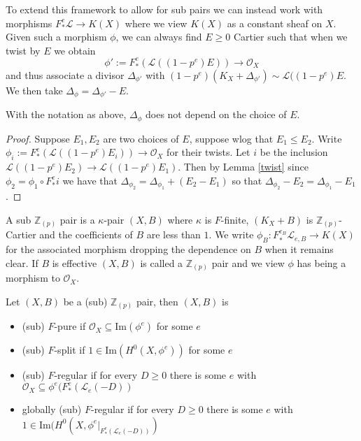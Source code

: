 \documentclass[a4paper,12pt]{book}
\newcommand{\Fe}[1][e]{F^{#1}_{*}}
\newcommand{\ox}[1][X]{\mathcal{O}_{#1}}
\newcommand{\zp}{\mathbb{Z}_{(p)}}
\begin{document}
To extend this framework to allow for sub pairs we can instead work with morphisms $\Fe\mathcal{L} \to K(X)$ where we view $K(X)$ as a constant sheaf on $X$. Given such a morphism $\phi$, we can always find $E \geq 0$ Cartier such that when we twist by $E$ we obtain $$\phi':=\Fe(\mathcal{L}((1-p^{e})E)) \to \ox$$ and thus associate a divisor $\Delta_{\phi'}$ with $(1-p^{e})(K_{X}+\Delta_{\phi'})\sim \mathcal{L}((1-p^{e})E$. We then take $\Delta_{\phi}=\Delta_{\phi'}-E$.

\begin{lemma}
	With the notation as above, $\Delta_{\phi}$ does not depend on the choice of $E$.
\end{lemma}
\begin{proof}
	Suppose $E_{1},E_{2}$ are two choices of $E$, suppose wlog that $E_{1} \leq E_{2}$. Write $\phi_{i}:=\Fe(\mathcal{L}((1-p^{e})E_{i})) \to \ox$ for their twists. Let $i$ be the inclusion $\mathcal{L}((1-p^{e})E_{2}) \to\mathcal{L}((1-p^{e})E_{1})$. Then by Lemma \ref{twist} since $\phi_{2}=\phi_{1}\circ F_{*}^{e}i$ we have that $\Delta_{\phi_{2}}=\Delta_{\phi_{1}}+(E_{2}-E_{1})$ so that $\Delta_{\phi_{2}}-E_{2}=\Delta_{\phi_{1}}-E_{1}$.
\end{proof}


\begin{definition}
	A sub $\zp$ pair is a $\kappa$-pair $(X,B)$ where $\kappa$ is $F$-finite, $(K_{X}+B)$ is $\zp$-Cartier and the coefficients of $B$ are less than $1$. We write $\phi_{B}: F_{*}^{e_{B}}\mathcal{L}_{e,B} \to K(X)$ for the associated morphism dropping the dependence on $B$ when it remains clear. If $B$ is effective $(X,B)$ is called a $\zp$ pair and we view $\phi$ has being a morphism to $\ox$.
	
	Let $(X,B)$ be a (sub) $\zp$ pair, then $(X,B)$ is
	\begin{itemize}
		\item (sub) $F$-pure if $\ox \subseteq \text{Im}(\phi^{e})$ for some $e$
		\item (sub) $F$-split if $1\in\text{Im}(H^{0}(X,\phi^{e}))$ for some $e$
		\item (sub) $F$-regular if for every $D \geq 0$ there is some $e$ with $\ox \subseteq \phi^{e}(\Fe(\mathcal{L}_{e}(-D))$ 
		\item globally (sub) $F$-regular if for every $D \geq 0$ there is some $e$ with $1\in\text{Im}(H^{0}(X,\phi^{e}|_{\Fe(\mathcal{L}_{e}(-D))})$ 
	\end{itemize}
\end{definition}
\end{document}
